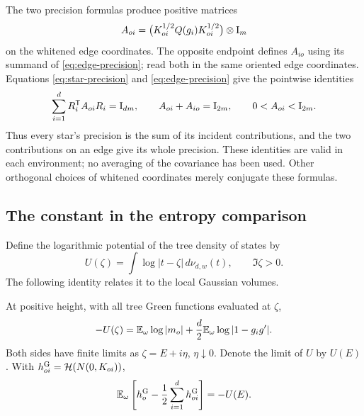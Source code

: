 The two precision formulas produce positive matrices
\[
 A_{oi}=\bigl(K_{oi}^{1/2}Q(g_i)K_{oi}^{1/2}\bigr)\otimes\mathrm I_m
\]
on the whitened edge coordinates.  The opposite endpoint defines
\(A_{io}\) using its summand of \eqref{eq:edge-precision}; read
both in the same oriented edge coordinates.  Equations
\eqref{eq:star-precision} and \eqref{eq:edge-precision} give the
pointwise identities
\begin{equation}\label{eq:precision-split}
 \sum_{i=1}^dR_i^{\mathsf T}A_{oi}R_i=\mathrm I_{dm},
 \qquad A_{oi}+A_{io}=\mathrm I_{2m},
 \qquad 0<A_{oi}<\mathrm I_{2m}.
\end{equation}
Thus every star's precision is the sum of its incident
contributions, and the two contributions on an edge give its
whole precision.  These identities are valid in each environment;
no averaging of the covariance has been used.  Other orthogonal
choices of whitened coordinates merely conjugate these formulas.

\subsection{The constant in the entropy comparison}

Define the logarithmic potential of the tree density of states by
\[
 U(\zeta)=\int\log|t-\zeta|\,d\nu_{d,w}(t),\qquad \Im\zeta>0.
\]
The following identity relates it to the local Gaussian volumes.

\begin{lemma}\label{lem:tree-log-potential}
At positive height, with all tree Green functions evaluated at
\(\zeta\),
\begin{equation}\label{eq:tree-log-potential}
 -U(\zeta)=\mathbb E_\omega\log|m_o|
       +\frac d2\mathbb E_\omega\log|1-g_i g'|.
\end{equation}
Both sides have finite limits as \(\zeta=E+i\eta\),
\(\eta\downarrow0\).  Denote the limit of \(U\) by \(U(E)\).
With \(h_{oi}^{\rm G}=\mathcal H(N(0,K_{oi}))\),
\begin{equation}\label{eq:gaussian-entropy-constant}
 \mathbb E_\omega\left[h_o^{\rm G}-\frac12\sum_{i=1}^d h_{oi}^{\rm G}\right]
 =-U(E).
\end{equation}
\end{lemma}

